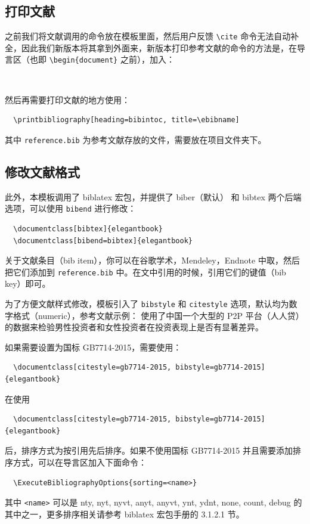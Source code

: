 \documentclass[lang=cn,newtx,10pt,scheme=chinese]{elegantbook}
\begin{document}
\subsection{打印文献}

之前我们将文献调用的命令放在模板里面，然后用户反馈 \lstinline{\cite} 命令无法自动补全，因此我们新版本将其拿到外面来，新版本打印参考文献的命令的方法是，在导言区（也即 \lstinline|\begin{document}| 之前），加入：

\begin{lstlisting}
  
\end{lstlisting}

然后再需要打印文献的地方使用：
\begin{lstlisting}
  \printbibliography[heading=bibintoc, title=\ebibname]
\end{lstlisting}

其中 \lstinline{reference.bib} 为参考文献存放的文件，需要放在项目文件夹下。

\subsection{修改文献格式}

此外，本模板调用了 biblatex 宏包，并提供了 biber（默认） 和 bibtex 两个后端选项，可以使用 \lstinline{bibend} 进行修改：

\begin{lstlisting}
  \documentclass[bibtex]{elegantbook}
  \documentclass[bibend=bibtex]{elegantbook}
\end{lstlisting}

关于文献条目（bib item），你可以在谷歌学术，Mendeley，Endnote 中取，然后把它们添加到 \lstinline{reference.bib} 中。在文中引用的时候，引用它们的键值（bib key）即可。

为了方便文献样式修改，模板引入了 \lstinline{bibstyle} 和 \lstinline{citestyle} 选项，默认均为数字格式（numeric），参考文献示例：\cite{cn1,en2,en3} 使用了中国一个大型的 P2P 平台（人人贷）的数据来检验男性投资者和女性投资者在投资表现上是否有显著差异。

如果需要设置为国标 GB7714-2015，需要使用：
\begin{lstlisting}
  \documentclass[citestyle=gb7714-2015, bibstyle=gb7714-2015]{elegantbook} 
\end{lstlisting}

在使用
\begin{lstlisting}
  \documentclass[citestyle=gb7714-2015, bibstyle=gb7714-2015]{elegantbook} 
\end{lstlisting}
后，排序方式为按引用先后排序。如果不使用国标 GB7714-2015 并且需要添加排序方式，可以在导言区加入下面命令：
\begin{lstlisting}
  \ExecuteBibliographyOptions{sorting=<name>}
\end{lstlisting}
其中 \lstinline{<name>} 可以是 nty, nyt, nyvt, anyt, anyvt, ynt, ydnt, none, count, debug 的其中之一，更多排序相关请参考 biblatex 宏包手册的 3.1.2.1 节。
\end{document}
